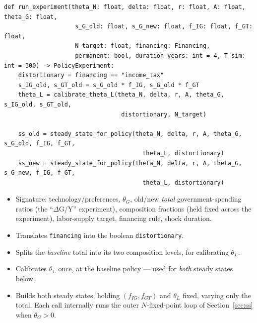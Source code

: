 \documentclass[11pt]{article}
\begin{document}
\begin{lstlisting}[firstnumber=428]
def run_experiment(theta_N: float, delta: float, r: float, A: float, theta_G: float,
                    s_G_old: float, s_G_new: float, f_IG: float, f_GT: float,
                    N_target: float, financing: Financing,
                    permanent: bool, duration_years: int = 4, T_sim: int = 300) -> PolicyExperiment:
    distortionary = financing == "income_tax"
    s_IG_old, s_GT_old = s_G_old * f_IG, s_G_old * f_GT
    theta_L = calibrate_theta_L(theta_N, delta, r, A, theta_G, s_IG_old, s_GT_old,
                                 distortionary, N_target)

    ss_old = steady_state_for_policy(theta_N, delta, r, A, theta_G, s_G_old, f_IG, f_GT,
                                       theta_L, distortionary)
    ss_new = steady_state_for_policy(theta_N, delta, r, A, theta_G, s_G_new, f_IG, f_GT,
                                       theta_L, distortionary)
\end{lstlisting}
\begin{itemize}
\item[\textbf{L428--L431}] Signature: technology/preferences, $\theta_G$,
old/new \emph{total} government-spending ratios (the ``$\Delta$G/Y'' experiment),
composition fractions (held fixed across the experiment), labor-supply
target, financing rule, shock duration.
\item[\textbf{L435}] Translates \texttt{financing} into the boolean
\texttt{distortionary}.
\item[\textbf{L436}] Splits the \emph{baseline} total into its two
composition levels, for calibrating $\theta_L$.
\item[\textbf{L437--L438}] Calibrates $\theta_L$ once, at the baseline
policy --- used for \emph{both} steady states below.
\item[\textbf{L440--L443}] Builds both steady states, holding
$(f_{IG},f_{GT})$ and $\theta_L$ fixed, varying only the total. Each call
internally runs the outer $N$-fixed-point loop of Section~\ref{sec:ss}
when $\theta_G>0$.
\end{itemize}
\end{document}
